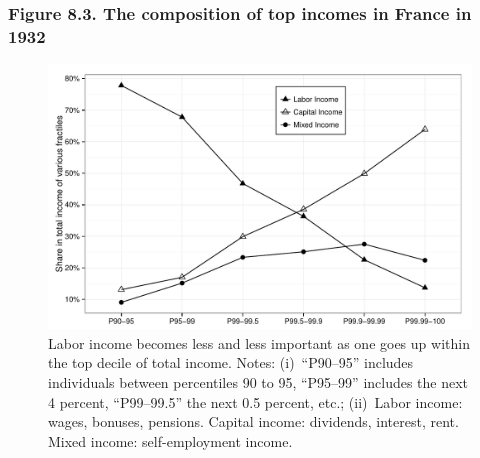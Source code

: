 \documentclass[t]{beamer}\usepackage[]{graphicx}\usepackage[]{color}
\newenvironment{knitrout}{}{} %
\begin{document}
\begin{frame}[label=Figure_8_3,fragile]
\frametitle{Figure 8.3. The composition of top incomes in France in 1932}
\begin{figure}[t]
\begin{minipage}[b]{\textwidth}
\centering
\begin{knitrout}\footnotesize
{}\color{fgcolor}

{\centering \includegraphics[width=1\linewidth]{figures/bw/Figure_8_3} 

}



\end{knitrout}
\caption{Labor income becomes less and less important as one goes up within the top decile of total income. Notes: (i)~``P90--95'' includes individuals between percentiles 90 to 95, ``P95--99'' includes the next 4 percent, ``P99--99.5'' the next 0.5 percent, etc.; (ii)~Labor income: wages, bonuses, pensions. Capital income: dividends, interest, rent. Mixed income: self-employment income.}
\end{minipage}
\end{figure}
\end{frame}
\end{document}
